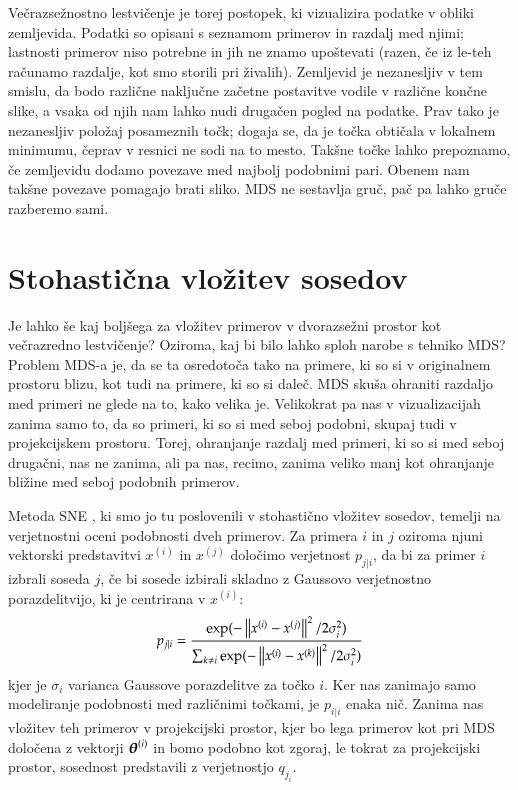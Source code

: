 Večrazsežnostno lestvičenje je torej postopek, ki vizualizira podatke v obliki zemljevida. Podatki so opisani s seznamom primerov in razdalj med njimi; lastnosti primerov niso potrebne in jih ne znamo upoštevati (razen, če iz le-teh računamo razdalje, kot smo storili pri živalih). Zemljevid je nezanesljiv v tem smislu, da bodo različne naključne začetne postavitve vodile v različne končne slike, a vsaka od njih nam lahko nudi drugačen pogled na podatke. Prav tako je nezanesljiv položaj posameznih točk; dogaja se, da je točka obtičala v lokalnem minimumu, čeprav v resnici ne sodi na to mesto. Takšne točke lahko prepoznamo, če zemljevidu dodamo povezave med najbolj podobnimi pari. Obenem nam takšne povezave pomagajo brati sliko. MDS ne sestavlja gruč, pač pa lahko gruče razberemo sami.

\section{Stohastična vložitev sosedov}

Je lahko še kaj boljšega za vložitev primerov v dvorazsežni prostor kot večrazredno lestvičenje? Oziroma, kaj bi bilo lahko sploh narobe s tehniko MDS? Problem MDS-a je, da se ta osredotoča tako na primere, ki so si v originalnem prostoru blizu, kot tudi na primere, ki so si daleč. MDS skuša ohraniti razdaljo med primeri ne glede na to, kako velika je. Velikokrat pa nas v vizualizacijah zanima samo to, da so primeri, ki so si med seboj podobni, skupaj tudi v projekcijskem prostoru. Torej, ohranjanje razdalj med primeri, ki so si med seboj drugačni, nas ne zanima, ali pa nas, recimo, zanima veliko manj kot ohranjanje bližine med seboj podobnih primerov.

Metoda SNE , ki smo jo tu poslovenili v stohastično vložitev sosedov, temelji na verjetnostni oceni podobnosti dveh primerov. Za primera $i$ in $j$ oziroma njuni vektorski predstavitvi $x^{(i)}$ in $x^{(j)}$ določimo verjetnost $p_{j|i}$, da bi za primer $i$ izbrali soseda $j$, če bi sosede izbirali skladno z Gaussovo verjetnostno porazdelitvijo, ki je centrirana v $x^{(i)}$:
\begin{equation}
  p_{j|i}=\frac{\exp(-\left\lVert x^{(i)}-x^{(j)}\right\rVert^2/2\sigma_i^2)}
  {\sum_{k\neq i}\exp(-\left\lVert x^{(i)}-x^{(k)}\right\rVert^2/2\sigma_i^2)}
\end{equation}
kjer je $\sigma_i$ varianca Gaussove porazdelitve za točko $i$. Ker nas zanimajo samo modeliranje podobnosti med različnimi točkami, je $p_{i|i}$ enaka nič. Zanima nas vložitev teh primerov v projekcijski prostor, kjer bo lega primerov kot pri MDS določena z vektorji $\boldsymbol{\theta}^{(i)}$ in bomo podobno kot zgoraj, le tokrat za projekcijski prostor, sosednost predstavili z verjetnostjo $q_{j_i}$.

